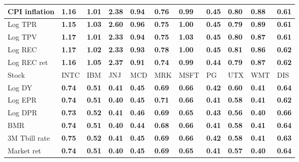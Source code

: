 \begin{table}[h!]
{\begin{center}
\begin{tabularx}{1\textwidth}{@{}X@{\hspace{0.25cm}}l@{\hspace{0.25cm}}l@{\hspace{0.25cm}}l@{\hspace{0.25cm}}l@{\hspace{0.25cm}}l@{\hspace{0.25cm}}l@{\hspace{0.25cm}}l@{\hspace{0.25cm}}l@{\hspace{0.25cm}}l@{\hspace{0.25cm}}l@{}}
 CPI inflation  & \textbf{1.16}	 & \textbf{1.01}	 & \textbf{2.38}	 & \textbf{0.94}	 & \textbf{0.76}	 & \textbf{0.99}	 & \textbf{0.45}	 & \textbf{0.80}	 & \textbf{0.88}	 & \textbf{0.61}	\\
\midrule
 Log TPR  & \textbf{1.15}	 & \textbf{1.03}	 & \textbf{2.60}	 & \textbf{0.96}	 & \textbf{0.75}	 & \textbf{1.00}	 & \textbf{0.45}	 & \textbf{0.79}	 & \textbf{0.89}	 & \textbf{0.61}	\\
 Log TPV  & \textbf{1.17}	 & \textbf{1.01}	 & \textbf{2.33}	 & \textbf{0.94}	 & \textbf{0.75}	 & \textbf{1.03}	 & \textbf{0.45}	 & \textbf{0.80}	 & \textbf{0.87}	 & \textbf{0.61}	\\
 Log REC  & \textbf{1.17}	 & \textbf{1.02}	 & \textbf{2.33}	 & \textbf{0.93}	 & \textbf{0.78}	 & \textbf{1.00}	 & \textbf{0.45}	 & \textbf{0.81}	 & \textbf{0.86}	 & \textbf{0.62}	\\
 Log REC ret  & \textbf{1.16}	 & \textbf{1.05}	 & \textbf{2.37}	 & \textbf{0.91}	 & \textbf{0.74}	 & \textbf{0.99}	 & \textbf{0.44}	 & \textbf{0.79}	 & \textbf{0.87}	 & \textbf{0.62}	\\
\midrule
\midrule
 Stock  & INTC	 & IBM	 & JNJ	 & MCD	 & MRK	 & MSFT	 & PG	 & UTX	 & WMT	 & DIS	\\
\midrule
 Log DY  & \textbf{0.74}	 & \textbf{0.51}	 & \textbf{0.41}	 & \textbf{0.45}	 & \textbf{0.69}	 & \textbf{0.66}	 & \textbf{0.42}	 & \textbf{0.60}	 & \textbf{0.41}	 & \textbf{0.64}	\\
 Log EPR  & \textbf{0.74}	 & \textbf{0.51}	 & \textbf{0.40}	 & \textbf{0.45}	 & \textbf{0.71}	 & \textbf{0.66}	 & \textbf{0.41}	 & \textbf{0.58}	 & \textbf{0.41}	 & \textbf{0.62}	\\
 Log DPR  & \textbf{0.73}	 & \textbf{0.52}	 & \textbf{0.41}	 & \textbf{0.46}	 & \textbf{0.69}	 & \textbf{0.65}	 & \textbf{0.43}	 & \textbf{0.56}	 & \textbf{0.40}	 & \textbf{0.66}	\\
 BMR  & \textbf{0.74}	 & \textbf{0.51}	 & \textbf{0.40}	 & \textbf{0.44}	 & \textbf{0.68}	 & \textbf{0.66}	 & \textbf{0.41}	 & \textbf{0.58}	 & \textbf{0.41}	 & \textbf{0.64}	\\
\midrule
 3M Tbill rate  & \textbf{0.75}	 & \textbf{0.52}	 & \textbf{0.41}	 & \textbf{0.45}	 & \textbf{0.69}	 & \textbf{0.66}	 & \textbf{0.42}	 & \textbf{0.58}	 & \textbf{0.41}	 & \textbf{0.63}	\\
 Market ret  & \textbf{0.74}	 & \textbf{0.51}	 & \textbf{0.40}	 & \textbf{0.45}	 & \textbf{0.69}	 & \textbf{0.65}	 & \textbf{0.41}	 & \textbf{0.57}	 & \textbf{0.40}	 & \textbf{0.64}	\\

\end{tabularx}
\end{center}}
\end{table}

